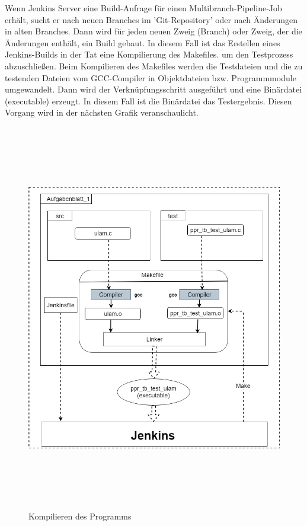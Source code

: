 \documentclass[a4paper,12pt,oneside]{book}
\begin{document}
\newline
Wenn Jenkins Server eine Build-Anfrage für einen Multibranch-Pipeline-Job erhält, sucht er nach neuen Branches im 'Git-Repository' oder nach Änderungen in alten Branches. Dann wird für jeden neuen Zweig (Branch) oder Zweig, der die Änderungen enthält, ein Build gebaut.
\newline
In diesem Fall ist das Erstellen eines Jenkins-Builds in der Tat eine Kompilierung des Makefiles. um den Testprozess abzuschließen.
\newline
Beim Kompilieren des Makefiles werden die Testdateien und die zu testenden Dateien vom GCC-Compiler in Objektdateien bzw. Programmmodule umgewandelt. Dann wird der Verknüpfungsschritt ausgeführt und eine Binärdatei (executable) erzeugt. In diesem Fall ist die Binärdatei das Testergebnis. Diesen Vorgang wird in der nächsten Grafik veranschaulicht.
\newpage
\begin{figure}[h!]
	\begin{center}
		\includegraphics[width=15cm, height=17cm]{Makefile.jpg}
		\caption{Kompilieren des Programms} 
		\label{Kompilieren des Programms} 
	\end{center}
\end{figure}
\end{document}
